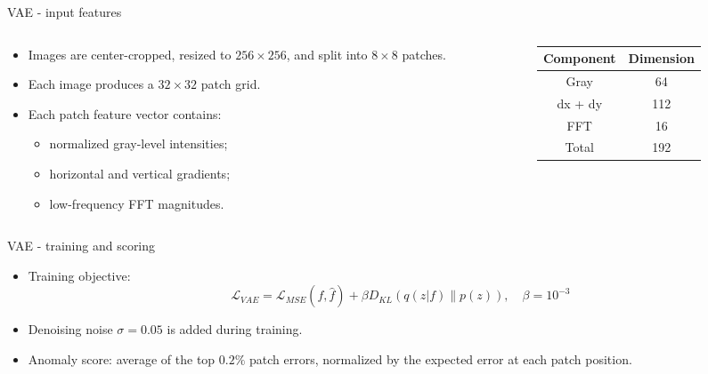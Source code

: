 \documentclass{beamer}
\begin{document}
\begin{frame}{VAE - input features}
    \begin{columns}
        \begin{column}{0.52\textwidth}
            \begin{itemize}
                \item Images are center-cropped, resized to $256 \times 256$, and split into $8 \times 8$ patches.
                \item Each image produces a $32 \times 32$ patch grid.
                \item Each patch feature vector contains:
                \begin{itemize}
                    \item normalized gray-level intensities;
                    \item horizontal and vertical gradients;
                    \item low-frequency FFT magnitudes.
                \end{itemize}
            \end{itemize}
        \end{column}
        \begin{column}{0.48\textwidth}
            \begin{table}
                \centering
                \footnotesize
                \begin{tabular}{|c|c|}
                \hline
                    Component & Dimension\\
                \hline
                    Gray & 64\\
                \hline
                    dx + dy & 112\\
                \hline
                    FFT & 16\\
                \hline
                    Total & 192\\
                \hline
                \end{tabular}
            \end{table}
        \end{column}
    \end{columns}
\end{frame}

\begin{frame}{VAE - training and scoring}
    \begin{itemize}
        \item Training objective:
        \begin{equation*}
            \mathcal{L}_{VAE} = \mathcal{L}_{MSE}(f, \hat{f}) + \beta D_{KL}\left(q(z|f)\|p(z)\right), \quad \beta = 10^{-3}
        \end{equation*}
        \item Denoising noise $\sigma=0.05$ is added during training.
        \item Anomaly score: average of the top $0.2\%$ patch errors, normalized by the expected error at each patch position.
    \end{itemize}
\end{frame}
\end{document}
